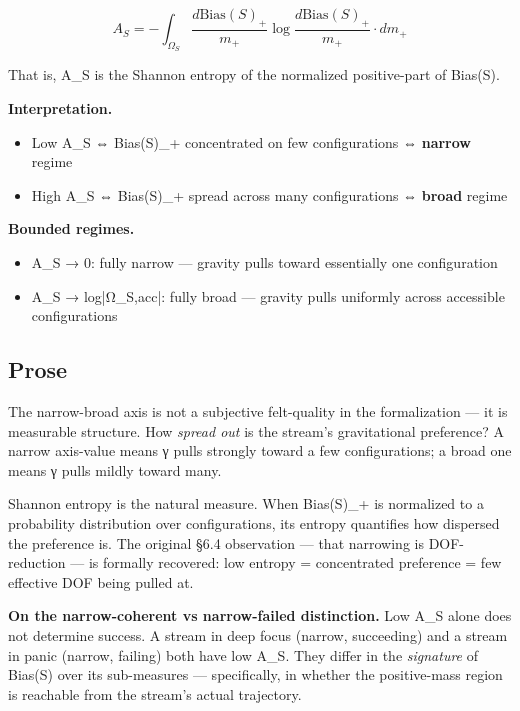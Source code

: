 \documentclass[11pt, openany]{book}
\begin{document}
$$A_S = -\int_{\Omega_S} \frac{d\text{Bias}(S)_+}{m_+} \log \frac{d\text{Bias}(S)_+}{m_+} \cdot dm_+$$

That is, A\_\allowbreak{}S is the Shannon entropy of the normalized positive-part of Bias(S).

\textbf{Interpretation.}
\begin{itemize}
\item Low A\_\allowbreak{}S ⇔ Bias(S)\_\allowbreak{}+ concentrated on few configurations ⇔ \textbf{narrow} regime
\item High A\_\allowbreak{}S ⇔ Bias(S)\_\allowbreak{}+ spread across many configurations ⇔ \textbf{broad} regime
\end{itemize}

\textbf{Bounded regimes.}
\begin{itemize}
\item A\_\allowbreak{}S → 0: fully narrow --- gravity pulls toward essentially one configuration
\item A\_\allowbreak{}S → log|Ω\_\allowbreak{}S,acc|: fully broad --- gravity pulls uniformly across accessible configurations
\end{itemize}

\subsection{Prose}

The narrow-broad axis is not a subjective felt-quality in the formalization --- it is measurable structure. How \textit{spread out} is the stream's gravitational preference? A narrow axis-value means γ pulls strongly toward a few configurations; a broad one means γ pulls mildly toward many.

Shannon entropy is the natural measure. When Bias(S)\_\allowbreak{}+ is normalized to a probability distribution over configurations, its entropy quantifies how dispersed the preference is. The original §6.4 observation --- that narrowing is DOF-reduction --- is formally recovered: low entropy = concentrated preference = few effective DOF being pulled at.

\textbf{On the narrow-coherent vs narrow-failed distinction.} Low A\_\allowbreak{}S alone does not determine success. A stream in deep focus (narrow, succeeding) and a stream in panic (narrow, failing) both have low A\_\allowbreak{}S. They differ in the \textit{signature} of Bias(S) over its sub-measures --- specifically, in whether the positive-mass region is reachable from the stream's actual trajectory.
\end{document}
